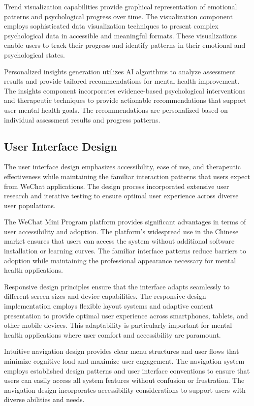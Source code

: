 Trend visualization capabilities provide graphical representation of emotional patterns and psychological progress over time. The visualization component employs sophisticated data visualization techniques to present complex psychological data in accessible and meaningful formats. These visualizations enable users to track their progress and identify patterns in their emotional and psychological states.

Personalized insights generation utilizes AI algorithms to analyze assessment results and provide tailored recommendations for mental health improvement. The insights component incorporates evidence-based psychological interventions and therapeutic techniques to provide actionable recommendations that support user mental health goals. The recommendations are personalized based on individual assessment results and progress patterns.

\subsection{User Interface Design}

The user interface design emphasizes accessibility, ease of use, and therapeutic effectiveness while maintaining the familiar interaction patterns that users expect from WeChat applications. The design process incorporated extensive user research and iterative testing to ensure optimal user experience across diverse user populations.

The WeChat Mini Program platform provides significant advantages in terms of user accessibility and adoption. The platform's widespread use in the Chinese market ensures that users can access the system without additional software installation or learning curves. The familiar interface patterns reduce barriers to adoption while maintaining the professional appearance necessary for mental health applications.

Responsive design principles ensure that the interface adapts seamlessly to different screen sizes and device capabilities. The responsive design implementation employs flexible layout systems and adaptive content presentation to provide optimal user experience across smartphones, tablets, and other mobile devices. This adaptability is particularly important for mental health applications where user comfort and accessibility are paramount.

Intuitive navigation design provides clear menu structures and user flows that minimize cognitive load and maximize user engagement. The navigation system employs established design patterns and user interface conventions to ensure that users can easily access all system features without confusion or frustration. The navigation design incorporates accessibility considerations to support users with diverse abilities and needs.

